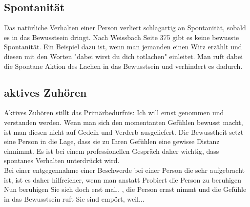\subsection*{Spontanität}
Das natürliche Verhalten einer Person verliert schlagartig an Spontanität, sobald es in das Bewusstsein dringt. Nach Weissbach Seite 375 gibt es keine bewusste Spontanität. Ein Beispiel dazu ist, wenn man jemanden einen Witz erzählt und diesen mit den Worten "dabei wirst du dich totlachen" einleitet. Man ruft dabei die Spontane Aktion des Lachen in das Bewusstsein und verhindert es dadurch.
\subsection*{aktives Zuhören}
Aktives Zuhören stillt das Primärbedürfnis: Ich will ernst genommen und verstanden werden. Wenn man sich den momentanten Gefühlen bewusst macht, ist man diesen nicht auf Gedeih und Verderb ausgeliefert. Die Bewusstheit setzt eine Person in die Lage, dass sie zu Ihren Gefühlen eine gewisse Distanz einnimmt. Es ist bei einem professionellen Gespräch daher wichtig, dass spontanes Verhalten unterdrückt wird.\\
Bei einer entgegennahme einer Beschwerde bei einer Person die sehr aufgebracht ist, ist es daher hilfreicher, wenn man anstatt Probiert die Person zu beruhigen \glqq Nun beruhigen Sie sich doch erst mal.. \grqq, die Person ernst nimmt und die Gefühle in das Bewusstsein ruft \glqq Sie sind empört, weil...\grqq\\

